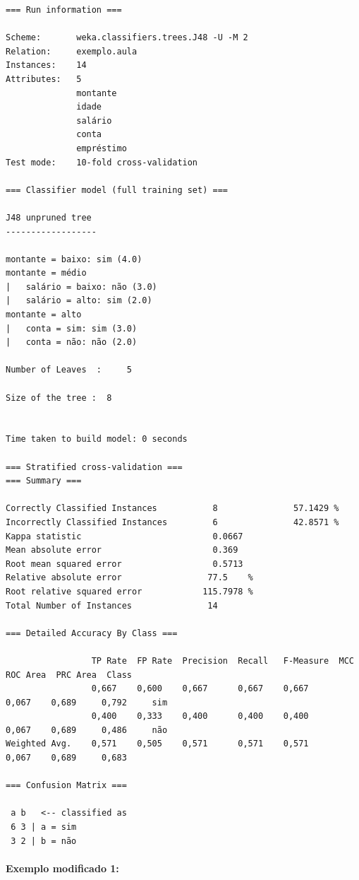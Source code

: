 \documentclass[
    article,            %
    11pt,               %
    oneside,            %
    a4paper,            %
    english,            %
    brazil,             %
    sumario=tradicional,
    ]{abntex2}
\begin{document}
\begin{Verbatim}[frame=single, fontsize=\tiny]
=== Run information ===

Scheme:       weka.classifiers.trees.J48 -U -M 2
Relation:     exemplo.aula
Instances:    14
Attributes:   5
              montante
              idade
              salário
              conta
              empréstimo
Test mode:    10-fold cross-validation

=== Classifier model (full training set) ===

J48 unpruned tree
------------------

montante = baixo: sim (4.0)
montante = médio
|   salário = baixo: não (3.0)
|   salário = alto: sim (2.0)
montante = alto
|   conta = sim: sim (3.0)
|   conta = não: não (2.0)

Number of Leaves  :     5

Size of the tree :  8


Time taken to build model: 0 seconds

=== Stratified cross-validation ===
=== Summary ===

Correctly Classified Instances           8               57.1429 %
Incorrectly Classified Instances         6               42.8571 %
Kappa statistic                          0.0667
Mean absolute error                      0.369 
Root mean squared error                  0.5713
Relative absolute error                 77.5    %
Root relative squared error            115.7978 %
Total Number of Instances               14     

=== Detailed Accuracy By Class ===

                 TP Rate  FP Rate  Precision  Recall   F-Measure  MCC      ROC Area  PRC Area  Class
                 0,667    0,600    0,667      0,667    0,667      0,067    0,689     0,792     sim
                 0,400    0,333    0,400      0,400    0,400      0,067    0,689     0,486     não
Weighted Avg.    0,571    0,505    0,571      0,571    0,571      0,067    0,689     0,683     

=== Confusion Matrix ===

 a b   <-- classified as
 6 3 | a = sim
 3 2 | b = não
 \end{Verbatim}

\paragraph*{\textbf{Exemplo modificado 1:}}
\end{document}
